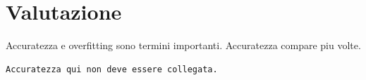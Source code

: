\documentclass{article}
\begin{document}
\section{Valutazione}
Accuratezza e overfitting sono termini importanti. Accuratezza compare piu volte.

\begin{verbatim}
Accuratezza qui non deve essere collegata.
\end{verbatim}
\end{document}
